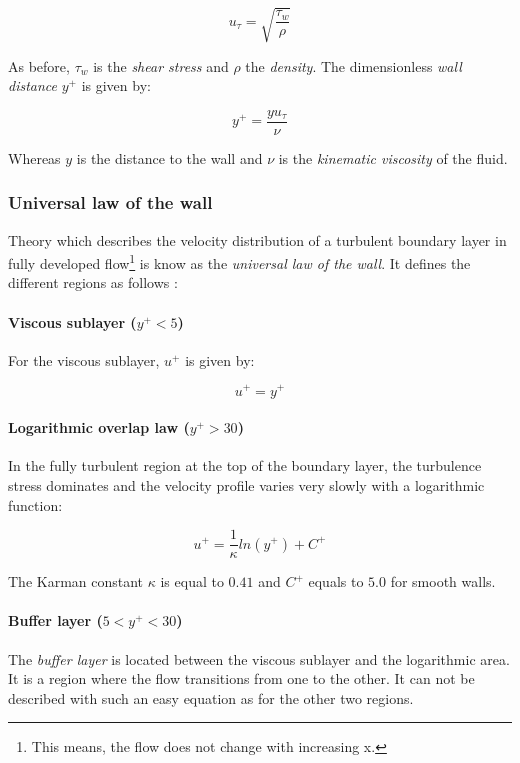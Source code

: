 \begin{equation}
  u_{\tau} = \sqrt{\frac{\tau_{w}}{\rho}}
\end{equation}

\noindent As before, $\tau_{w}$ is the \textit{shear stress} and $\rho$ the
\textit{density}. The dimensionless \textit{wall distance} $y^{+}$ is given by:

\begin{equation}
  y^{+} = \frac{yu_{\tau}}{\nu}
\end{equation}

\noindent Whereas $y$ is the distance to the wall and $\nu$ is the
\textit{kinematic viscosity} of the fluid.


\subsubsection{Universal law of the wall}
Theory which describes the velocity distribution of a turbulent boundary layer
in fully developed flow\footnote{This means, the flow does not change with
increasing x.}  is know as the \textit{universal law of the wall}. It defines
the different regions as follows \cite{Schlichting2018}:

\paragraph{Viscous sublayer ($y^{+} < 5$)}
For the viscous sublayer, $u^{+}$ is given by:

\begin{equation}
  u^{+} = y^{+}
\end{equation}

\paragraph{Logarithmic overlap law ($y^{+} > 30$)}
In the fully turbulent region at the top of the boundary layer, the turbulence
stress dominates and the velocity profile varies very slowly with a logarithmic
function:

\begin{equation}
  u^{+} = \frac{1}{\kappa} ln(y^{+}) + C^{+}
  \label{eq:overlap_law}
\end{equation}

\noindent The Karman constant $\kappa$ is equal to $0.41$ and $C^{+}$ equals to
$5.0$ for smooth walls.

\paragraph{Buffer layer ($5 < y^{+} < 30$)}
The \textit{buffer layer} is located between the viscous sublayer and the
logarithmic area. It is a region where the flow transitions from one to the
other. It can not be described with such an easy equation as for the other two
regions.

